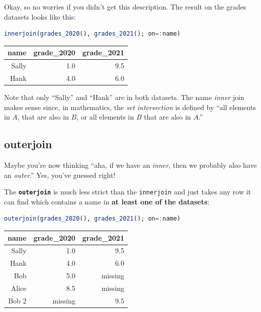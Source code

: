 \documentclass[
  notoc %
]{tufte-book}
\newcommand{\passthrough}[1]{#1}
\begin{document}
Okay, so no worries if you didn't get this description. The result on
the grades datasets looks like this:

\begin{lstlisting}[language=Julia]
innerjoin(grades_2020(), grades_2021(); on=:name)
\end{lstlisting}

\begin{longtable}[]{@{}rrr@{}}
\toprule
name & grade\_2020 & grade\_2021 \\
\midrule
\endhead
Sally & 1.0 & 9.5 \\
Hank & 4.0 & 6.0 \\
\bottomrule
\end{longtable}

Note that only ``Sally'' and ``Hank'' are in both datasets. The name
\emph{inner} join makes sense since, in mathematics, the \emph{set
intersection} is defined by ``all elements in \(A\), that are also in
\(B\), or all elements in \(B\) that are also in \(A\).''

\hypertarget{sec:outerjoin}{%
\subsection{outerjoin}\label{sec:outerjoin}}

Maybe you're now thinking ``aha, if we have an \emph{inner}, then we
probably also have an \emph{outer}.'' Yes, you've guessed right!

The \textbf{\passthrough{\lstinline!outerjoin!}} is much less strict
than the \passthrough{\lstinline!innerjoin!} and just takes any row it
can find which contains a name in \textbf{at least one of the datasets}:

\begin{lstlisting}[language=Julia]
outerjoin(grades_2020(), grades_2021(); on=:name)
\end{lstlisting}

\begin{longtable}[]{@{}rrr@{}}
\toprule
name & grade\_2020 & grade\_2021 \\
\midrule
\endhead
Sally & 1.0 & 9.5 \\
Hank & 4.0 & 6.0 \\
Bob & 5.0 & missing \\
Alice & 8.5 & missing \\
Bob 2 & missing & 9.5 \\
\bottomrule
\end{longtable}
\end{document}
